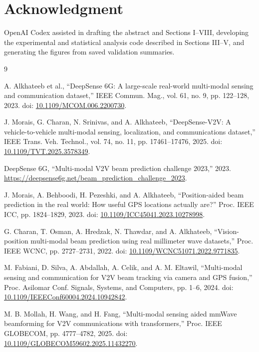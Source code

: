 \documentclass[10pt,journal,letterpaper]{IEEEtran}
\begin{document}
\section*{Acknowledgment}

OpenAI Codex assisted in drafting the abstract and Sections I--VIII, developing the experimental and statistical analysis code described in Sections III--V, and generating the figures from saved validation summaries.

\begin{thebibliography}{9}

 A. Alkhateeb et al., ``DeepSense 6G: A large-scale real-world multi-modal sensing and communication dataset,'' IEEE Commun. Mag., vol. 61, no. 9, pp. 122--128, 2023. doi: \href{https://doi.org/10.1109/MCOM.006.2200730}{10.1109/MCOM.006.2200730}.

 J. Morais, G. Charan, N. Srinivas, and A. Alkhateeb, ``DeepSense-V2V: A vehicle-to-vehicle multi-modal sensing, localization, and communications dataset,'' IEEE Trans. Veh. Technol., vol. 74, no. 11, pp. 17461--17476, 2025. doi: \href{https://doi.org/10.1109/TVT.2025.3578349}{10.1109/TVT.2025.3578349}.

 DeepSense 6G, ``Multi-modal V2V beam prediction challenge 2023,'' 2023. \url{https://deepsense6g.net/beam_prediction_challenge_2023}.

 J. Morais, A. Behboodi, H. Pezeshki, and A. Alkhateeb, ``Position-aided beam prediction in the real world: How useful GPS locations actually are?'' Proc. IEEE ICC, pp. 1824--1829, 2023. doi: \href{https://doi.org/10.1109/ICC45041.2023.10278998}{10.1109/ICC45041.2023.10278998}.

 G. Charan, T. Osman, A. Hredzak, N. Thawdar, and A. Alkhateeb, ``Vision-position multi-modal beam prediction using real millimeter wave datasets,'' Proc. IEEE WCNC, pp. 2727--2731, 2022. doi: \href{https://doi.org/10.1109/WCNC51071.2022.9771835}{10.1109/WCNC51071.2022.9771835}.

 M. Fabiani, D. Silva, A. Abdallah, A. Celik, and A. M. Eltawil, ``Multi-modal sensing and communication for V2V beam tracking via camera and GPS fusion,'' Proc. Asilomar Conf. Signals, Systems, and Computers, pp. 1--6, 2024. doi: \href{https://doi.org/10.1109/IEEEConf60004.2024.10942842}{10.1109/IEEEConf60004.2024.10942842}.

 M. B. Mollah, H. Wang, and H. Fang, ``Multi-modal sensing aided mmWave beamforming for V2V communications with transformers,'' Proc. IEEE GLOBECOM, pp. 4777--4782, 2025. doi: \href{https://doi.org/10.1109/GLOBECOM59602.2025.11432270}{10.1109/GLOBECOM59602.2025.11432270}.


\end{thebibliography}
\end{document}

